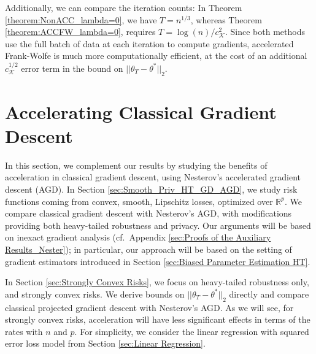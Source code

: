 \documentclass{article}
\begin{document}
Additionally, we can compare the iteration counts: In Theorem \ref{theorem:NonACC_lambda=0}, we have $T = n^{1/3}$, whereas Theorem \ref{theorem:ACCFW_lambda=0}, requires $T = \log(n)/c_{\mathcal{K}}^2$. Since both methods use the full batch of data at each iteration to compute gradients, accelerated Frank-Wolfe is much more computationally efficient, at the cost of an additional $c_{\mathcal{K}}^{1/2}$ error term in the bound on $||\theta_T - \theta^*||_2$.



\section{Accelerating Classical Gradient Descent}
\label{sec:Unbiased Parameter Estimation}

In this section, we complement our results by studying the benefits of acceleration in classical gradient descent, using Nesterov's accelerated gradient descent (AGD). In Section \ref{sec:Smooth_Priv_HT_GD_AGD}, we study risk functions coming from convex, smooth, Lipschitz losses, optimized over $\mathbb{R}^p$. We compare classical gradient descent with Nesterov's AGD, with modifications providing both heavy-tailed robustness and privacy. Our arguments will be based on inexact gradient analysis (cf.\ Appendix \ref{sec:Proofs of the Auxiliary Results_Nester}); in particular, our approach will be based on the setting of gradient estimators introduced in Section \ref{sec:Biased Parameter Estimation HT}.

In Section \ref{sec:Strongly Convex Risks}, we focus on heavy-tailed robustness only, and strongly convex risks. We derive bounds on $||\theta_T - \theta^*||_2$ directly and compare classical projected gradient descent with Nesterov's AGD. As we will see, for strongly convex risks, acceleration will have less significant effects in terms of the rates with $n$ and $p$. For simplicity, we consider the linear regression with squared error loss model from Section \ref{sec:Linear Regression}.
\end{document}

